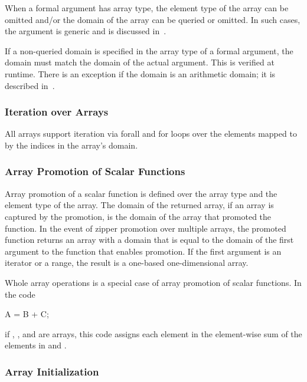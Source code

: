 When a formal argument has array type, the element type of the array
can be omitted and/or the domain of the array can be queried or
omitted.  In such cases, the argument is generic and is discussed
in~.

If a non-queried domain is specified in the array type of a formal
argument, the domain must match the domain of the actual argument.
This is verified at runtime.  There is an exception if the domain is
an arithmetic domain; it is described
in~.

\subsubsection{Iteration over Arrays}
\label{Iteration_over_Arrays}

All arrays support iteration via forall and for loops over the
elements mapped to by the indices in the array's domain.

\subsubsection{Array Promotion of Scalar Functions}
\label{Array_Promotion_of_Scalar_Functions}

Array promotion of a scalar function is defined over the array type
and the element type of the array.  The domain of the returned array,
if an array is captured by the promotion, is the domain of the array
that promoted the function.  In the event of zipper promotion over
multiple arrays, the promoted function returns an array with a domain
that is equal to the domain of the first argument to the function that
enables promotion.  If the first argument is an iterator or a range,
the result is a one-based one-dimensional array.

\begin{example}
Whole array operations is a special case of array promotion of scalar
functions.  In the code
\begin{chapel}
A = B + C;
\end{chapel}
if , , and  are arrays, this code assigns each
element in  the element-wise sum of the elements in 
and .
\end{example}

\subsubsection{Array Initialization}
\label{Array_Initialization}


